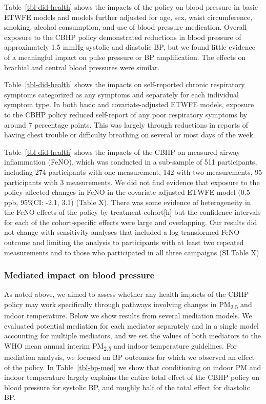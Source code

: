 \documentclass[
  letterpaper,
  DIV=11,
  numbers=noendperiod]{scrartcl}
\begin{document}
Table~\ref{tbl-did-health} shows the impacts of the policy on blood
pressure in basic ETWFE models and models further adjusted for age, sex,
waist circumference, smoking, alcohol consumption, and use of blood
pressure medication. Overall exposure to the CBHP policy demonstrated
reductions in blood pressure of approximately 1.5 mmHg systolic and
diastolic BP, but we found little evidence of a meaningful impact on
pulse pressure or BP amplification. The effects on brachial and central
blood pressures were similar.

Table~\ref{tbl-did-health} shows the impacts on self-reported chronic
respiratory symptoms categorized as any symptoms and separately for each
individual symptom type. In both basic and covariate-adjusted ETWFE
models, exposure to the CBHP policy reduced self-report of any poor
respiratory symptoms by around 7 percentage points. This was largely
through reductions in reports of having chest trouble or difficulty
breathing on several or most days of the week.

Table~\ref{tbl-did-health} shows the impacts of the CBHP on measured
airway inflammation (FeNO), which was conducted in a sub-sample of 511
participants, including 274 participants with one measurement, 142 with
two measurements, 95 participants with 3 measurements. We did not find
evidence that exposure to the policy affected changes in FeNO in the
covariate-adjusted ETWFE model (0.5 ppb, 95\%CI: -2.1, 3.1) (Table X).
There was some evidence of heterogeneity in the FeNO effects of the
policy by treatment cohort{[}h{]} but the confidence intervals for each
of the cohort-specific effects were large and overlapping. Our results
did not change with sensitivity analyses that included a log-transformed
FeNO outcome and limiting the analysis to participants with at least two
repeated measurements and to those who participated in all three
campaigns (SI Table X)

\hypertarget{mediated-impact-on-blood-pressure}{%
\subsubsection{Mediated impact on blood
pressure}\label{mediated-impact-on-blood-pressure}}

As noted above, we aimed to assess whether any health impacts of the
CBHP policy may work specifically through pathways involving changes in
PM\textsubscript{2.5} and indoor temperature. Below we show results from
several mediation models. We evaluated potential mediation for each
mediator separately and in a single model accounting for multiple
mediators, and we set the values of both mediators to the WHO mean
annual interim PM\textsubscript{2.5} and indoor temperature guidelines.
For mediation analysis, we focused on BP outcomes for which we observed
an effect of the policy. In Table~\ref{tbl-bp-med} we show that
conditioning on indoor PM and indoor temperature largely explains the
entire total effect of the CBHP policy on blood pressure for systolic
BP, and roughly half of the total effect for diastolic BP.
\end{document}
